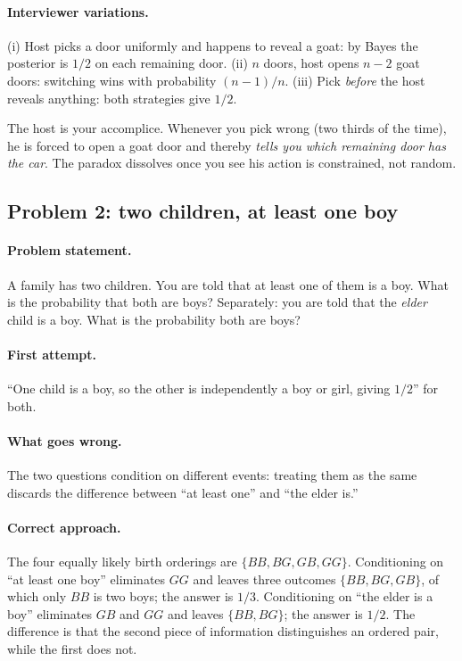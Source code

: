 \paragraph{Interviewer variations.}
(i) Host picks a door uniformly and happens to reveal a goat: by
Bayes the posterior is $1/2$ on each remaining door.  (ii) $n$
doors, host opens $n-2$ goat doors: switching wins with
probability $(n-1)/n$.  (iii) Pick \emph{before} the host reveals
anything: both strategies give $1/2$.

\begin{intuitionbox}
The host is your accomplice.  Whenever you pick wrong (two thirds
of the time), he is forced to open a goat door and thereby
\emph{tells you which remaining door has the car}.  The paradox
dissolves once you see his action is constrained, not random.
\end{intuitionbox}

\subsection{Problem 2: two children, at least one boy}
\label{sec:twokids}

\paragraph{Problem statement.}
A family has two children.  You are told that at least one of
them is a boy.  What is the probability that both are boys?
Separately: you are told that the \emph{elder} child is a boy.
What is the probability both are boys?

\paragraph{First attempt.}
``One child is a boy, so the other is independently a boy or girl,
giving $1/2$'' for both.

\paragraph{What goes wrong.}
The two questions condition on different events: treating them as
the same discards the difference between ``at least one'' and
``the elder is.''

\paragraph{Correct approach.}
The four equally likely birth orderings are
$\{BB, BG, GB, GG\}$.  Conditioning on ``at least one boy''
eliminates $GG$ and leaves three outcomes $\{BB, BG, GB\}$, of
which only $BB$ is two boys; the answer is $1/3$.  Conditioning
on ``the elder is a boy'' eliminates $GB$ and $GG$ and leaves
$\{BB, BG\}$; the answer is $1/2$.  The difference is that the
second piece of information distinguishes an ordered pair, while
the first does not.

